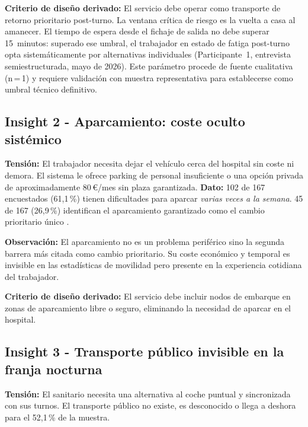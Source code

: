 \textbf{Criterio de diseño derivado:} El servicio debe operar
como transporte de retorno prioritario post-turno. La ventana
crítica de riesgo es la vuelta a casa al amanecer. El tiempo
de espera desde el fichaje de salida no debe superar
15~minutos: superado ese umbral, el trabajador en estado de
fatiga post-turno opta sistemáticamente por alternativas
individuales (Participante~1, entrevista semiestructurada,
mayo de 2026). Este parámetro procede de fuente cualitativa
(n\,=\,1) y requiere validación con muestra representativa
para establecerse como umbral técnico definitivo.


\subsection*{Insight 2 - Aparcamiento: coste oculto sistémico}
\label{sec:insight-2}

\textbf{Tensión:} El trabajador necesita dejar el vehículo cerca
del hospital sin coste ni demora. El sistema le ofrece parking
de personal insuficiente o una opción privada de aproximadamente
80\,€/mes sin plaza garantizada.
\textbf{Dato:} 102 de 167 encuestados (61{,}1\,\%) tienen
dificultades para aparcar \emph{varias veces a la semana}.
45 de 167 (26{,}9\,\%) identifican el aparcamiento garantizado
como el cambio prioritario único \parencite{LouridoRegueira2026}.

\textbf{Observación:} El aparcamiento no es un problema periférico sino la segunda barrera más citada como cambio prioritario. Su coste económico y temporal es invisible en las estadísticas de movilidad pero presente en la experiencia cotidiana del trabajador.

\textbf{Criterio de diseño derivado:} El servicio debe incluir
nodos de embarque en zonas de aparcamiento libre o seguro,
eliminando la necesidad de aparcar en el hospital.


\subsection*{Insight 3 - Transporte público invisible en la franja nocturna}
\label{sec:insight-3}

\textbf{Tensión:} El sanitario necesita una alternativa al coche
puntual y sincronizada con sus turnos. El transporte público no
existe, es desconocido o llega a deshora para el 52{,}1\,\%
de la muestra.

